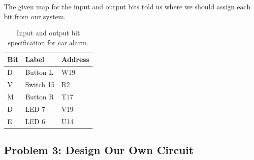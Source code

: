 \documentclass[11pt]{article}
\begin{document}
The given map for the input and output bits told us where we should assign each bit from our system.

\begin{table}[h]
\begin{center}
	\begin{tabular}{| l | l | l |}
		\hline
		Bit & Label & Address \\ \hline
		D & Button L & W19 \\ \hline
		V & Switch 15 & R2 \\ \hline
		M & Button R & T17 \\ \hline
		D & LED 7 & V19 \\ \hline
		E & LED 6 & U14 \\ \hline
	\end{tabular}
	\caption{\label{tab:table-name}Input and output bit specification for car alarm.}
\end{center}	
\end{table}


\subsection{Problem 3: Design Our Own Circuit}
\end{document}
